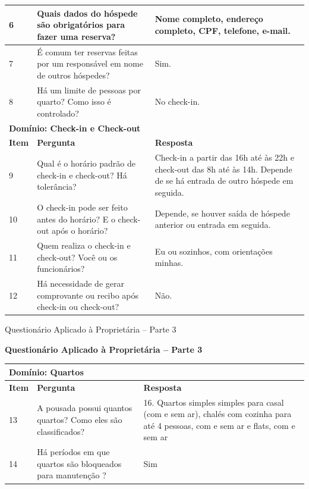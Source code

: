 \documentclass[
	12pt,				%
	openany,			%
	oneside,			%
	a4paper,			%
	english,			%
	french,				%
	spanish,			%
	brazil				%
	]{abntex2}
\begin{document}
\begin{apendicesenv}
\begin{quadro}[H]
\begin{tabular}{|p{1cm}|p{6.5cm}|p{6.5cm}|}
		6 & Quais dados do hóspede são obrigatórios para fazer uma reserva? & Nome completo, endereço completo, CPF, telefone, e-mail. \\ \hline
		7 & É comum ter reservas feitas por um responsável em nome de outros hóspedes? & Sim. \\ \hline
		8 & Há um limite de pessoas por quarto? Como isso é controlado? & No check-in. \\ \hline
		\multicolumn{3}{|l|}{\textbf{Domínio: Check-in e Check-out}} \\ \hline
		\textbf{Item} & \textbf{Pergunta} & \textbf{Resposta} \\ \hline
		9 & Qual é o horário padrão de check-in e check-out? Há tolerância? & Check-in a partir das 16h até às 22h e check-out das 8h até às 14h. Depende de se há entrada de outro hóspede em seguida. \\ \hline
		10 & O check-in pode ser feito antes do horário? E o check-out após o horário? & Depende, se houver saída de hóspede anterior ou entrada em seguida. \\ \hline
		11 & Quem realiza o check-in e check-out? Você ou os funcionários? & Eu ou sozinhos, com orientações minhas. \\ \hline
		12 & Há necessidade de gerar comprovante ou recibo após check-in ou check-out? & Não. \\ \hline
	\end{tabular}
\end{quadro}
\begin{quadro}[H]
	\caption{Questionário Aplicado à Proprietária – Parte 3}
	\label{quadro:questionario3}
	\vspace{0.3cm} 
	\textbf\bfseries\large{Questionário Aplicado à Proprietária – Parte 3} \\
	\vspace{0.3cm} 
	\begin{tabular}{|p{1cm}|p{6.5cm}|p{6.5cm}|}
		\hline
			\multicolumn{3}{|l|}{\textbf{Domínio: Quartos}} \\ \hline
		\textbf{Item} & \textbf{Pergunta} & \textbf{Resposta} \\
		\hline
		13 & A pousada possui quantos quartos? Como eles são classificados? & 16. Quartos simples simples para casal (com e sem ar), chalés com cozinha para até 4 pessoas, com e sem ar e flats, com e sem ar \\
		\hline
		14 & Há períodos em que quartos são bloqueados para manutenção ?& Sim\\
		\hline

\end{tabular}
\end{quadro}
\end{apendicesenv}
\end{document}
